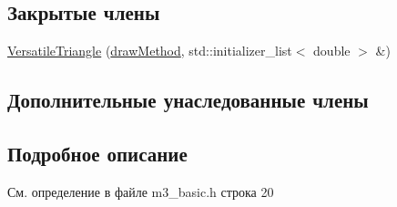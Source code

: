 \subsection*{Закрытые члены}
\begin{DoxyCompactItemize}
\item 
\hyperlink{class_versatile_triangle_aab319a2dd10de4db6eae4adae03e9621}{Versatile\-Triangle} (\hyperlink{class_multyline_ad75d7bb224267d0d7b4c40fd72a1d920}{draw\-Method}, std\-::initializer\-\_\-list$<$ double $>$ \&)
\end{DoxyCompactItemize}
\subsection*{Дополнительные унаследованные члены}


\subsection{Подробное описание}


См. определение в файле m3\-\_\-basic.\-h строка 20



